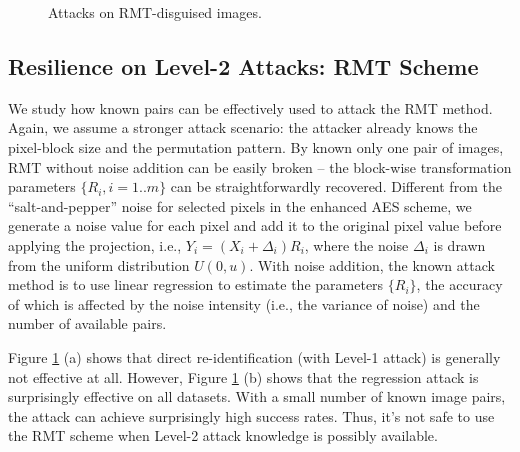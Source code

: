 \documentclass[conference]{IEEEtran}
\begin{document}
\begin{figure}[h]
{
	}
 	\caption{Attacks on RMT-disguised images.}
 	\label{fig:rmt-re-identification}
\end{figure}



\subsection{Resilience on Level-2 Attacks: RMT Scheme}
We study how known pairs can be effectively used to attack the RMT method. Again, we assume a stronger attack scenario: the attacker already knows the pixel-block size and the permutation pattern. By known only one pair of images, RMT without noise addition can be easily broken -- the block-wise transformation parameters $\{R_i, i=1..m\}$ can be straightforwardly recovered. Different from the ``salt-and-pepper'' noise for selected pixels in the enhanced AES scheme, we generate a noise value for each pixel and add it to the original pixel value before applying the projection, i.e., $Y_i = (X_i + \Delta_i)R_i$, where the noise $\Delta_i$ is drawn from the uniform distribution $U(0, u)$. With noise addition, the known attack method is to use linear regression to estimate the parameters $\{R_i\}$, the accuracy of which is affected by the noise intensity (i.e., the variance of noise) and the number of available pairs. 

Figure \ref{fig:rmt-re-identification} (a) shows that direct re-identification (with Level-1 attack) is generally not effective at all. However, Figure \ref{fig:rmt-re-identification} (b) shows that the regression attack is surprisingly effective on all datasets. With a small number of known image pairs, the attack can achieve surprisingly high success rates. Thus, it's not safe to use the RMT scheme when Level-2 attack knowledge is possibly available. 
\end{document}

